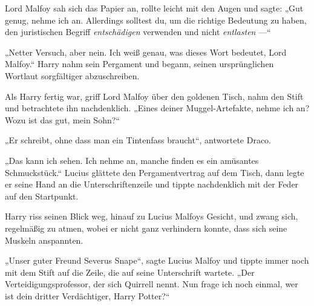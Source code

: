 Lord Malfoy sah sich das Papier an, rollte leicht mit den Augen und sagte:
„Gut genug, nehme ich an. Allerdings solltest du, um die richtige Bedeutung zu haben, den juristischen Begriff \emph{entschädigen} verwenden und nicht \emph{entlasten} —“

„Netter Versuch, aber nein. Ich weiß genau, was dieses Wort bedeutet, Lord Malfoy.“ Harry nahm sein Pergament und begann, seinen ursprünglichen Wortlaut sorgfältiger abzuschreiben.

Als Harry fertig war, griff Lord Malfoy über den goldenen Tisch, nahm den Stift und betrachtete ihn nachdenklich.
„Eines deiner Muggel-Artefakte, nehme ich an? Wozu ist das gut, mein Sohn?“

„Er schreibt, ohne dass man ein Tintenfass braucht“, antwortete Draco.

„Das kann ich sehen. Ich nehme an, manche finden es ein amüsantes Schmuckstück.“ Lucius glättete den Pergamentvertrag auf dem Tisch, dann legte er seine Hand an die Unterschriftenzeile und tippte nachdenklich mit der Feder auf den Startpunkt.

Harry riss seinen Blick weg, hinauf zu Lucius Malfoys Gesicht, und zwang sich, regelmäßig zu atmen, wobei er nicht ganz verhindern konnte, dass sich seine Muskeln anspannten.

„Unser guter Freund Severus Snape“, sagte Lucius Malfoy und tippte immer noch mit dem Stift auf die Zeile, die auf seine Unterschrift wartete.
„Der Verteidigungsprofessor, der sich Quirrell nennt. Nun frage ich noch einmal, wer ist dein dritter Verdächtiger, Harry Potter?“


